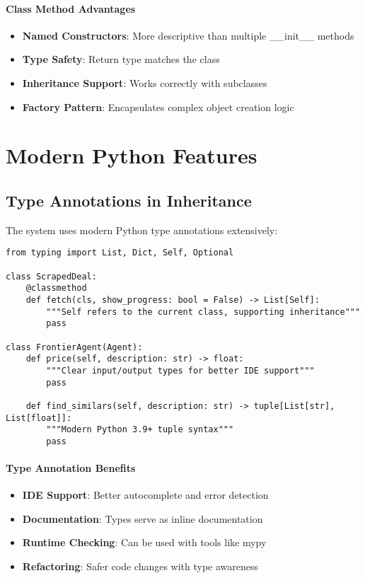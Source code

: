 \paragraph{Class Method Advantages}
\begin{itemize}
\item \textbf{Named Constructors}: More descriptive than multiple \_\_init\_\_ methods
\item \textbf{Type Safety}: Return type matches the class
\item \textbf{Inheritance Support}: Works correctly with subclasses
\item \textbf{Factory Pattern}: Encapsulates complex object creation logic
\end{itemize}

\section{Modern Python Features}

\subsection{Type Annotations in Inheritance}

The system uses modern Python type annotations extensively:

\begin{lstlisting}[caption=Advanced Type Annotations]
from typing import List, Dict, Self, Optional

class ScrapedDeal:
    @classmethod
    def fetch(cls, show_progress: bool = False) -> List[Self]:
        """Self refers to the current class, supporting inheritance"""
        pass
    
class FrontierAgent(Agent):
    def price(self, description: str) -> float:
        """Clear input/output types for better IDE support"""
        pass
        
    def find_similars(self, description: str) -> tuple[List[str], List[float]]:
        """Modern Python 3.9+ tuple syntax"""
        pass
\end{lstlisting}

\paragraph{Type Annotation Benefits}
\begin{itemize}
\item \textbf{IDE Support}: Better autocomplete and error detection
\item \textbf{Documentation}: Types serve as inline documentation
\item \textbf{Runtime Checking}: Can be used with tools like mypy
\item \textbf{Refactoring}: Safer code changes with type awareness
\end{itemize}

